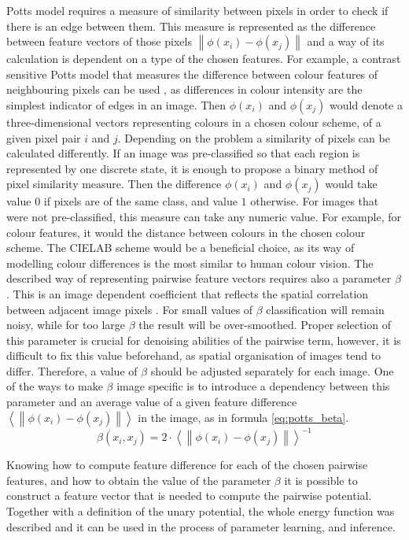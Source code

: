 Potts model requires a measure of similarity between pixels in order to check if there is an edge between them. This measure is represented as the difference between feature vectors of those pixels $\left \| \phi(x_i) - \phi(x_j)\right \|$ and a way of its calculation is dependent on a type of the chosen features. For example, a contrast sensitive Potts model that measures the difference between colour features of neighbouring pixels can be used \cite{article_main}, as differences in colour intensity are the simplest indicator of edges in an image. Then $\phi(x_i)$ and $\phi(x_j)$ would denote a three-dimensional vectors representing colours in a chosen colour scheme, of a given pixel pair $i$ and $j$. Depending on the problem a similarity of pixels can be calculated differently. If an image was pre-classified so that each region is represented by one discrete state, it is enough to propose a binary method of pixel similarity measure. Then the difference $\phi(x_i)$ and $\phi(x_j)$ would take value $0$ if pixels are of the same class, and value $1$ otherwise. For images that were not pre-classified, this measure can take any numeric value. For example, for colour features, it would the distance between colours in the chosen colour scheme. The CIELAB scheme would be a beneficial choice, as its way of modelling colour differences is the most similar to human colour vision. The described way of representing pairwise feature vectors requires also a parameter $\beta$. This is an image dependent coefficient that reflects the spatial correlation between adjacent image pixels \cite{potts_beta}. For small values of $\beta$ classification will remain noisy, while for too large $\beta$ the result will be over-smoothed. Proper selection of this parameter is crucial for denoising abilities of the pairwise term, however, it is difficult to fix this value beforehand, as spatial organisation of images tend to differ. Therefore, a value of $\beta$ should be adjusted separately for each image. One of the ways to make $\beta$ image specific is to introduce a dependency between this parameter and an average value of a given feature difference $\left \langle \left \| \phi(x_i) - \phi(x_j)\right \| \right \rangle$ in the image, as in formula \ref{eq:potts_beta}.
\begin{equation}
    \label{eq:potts_beta}
    \beta(x_i,x_j) = {2 \cdot {\left \langle \left \| \phi(x_i) - \phi(x_j)\right \| \right \rangle}} ^ {-1}
\end{equation}

Knowing how to compute feature difference for each of the chosen pairwise features, and how to obtain the value of the parameter $\beta$ it is possible to construct a feature vector that is needed to compute the pairwise potential. Together with a definition of the unary potential, the whole energy function was described and it can be used in the process of parameter learning, and inference.